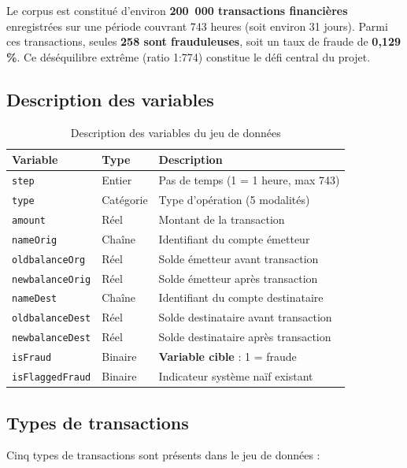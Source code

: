 Le corpus est constitué d'environ \textbf{200~000 transactions financières} enregistrées
sur une période couvrant 743 heures (soit environ 31 jours). Parmi ces transactions, seules
\textbf{258 sont frauduleuses}, soit un taux de fraude de \textbf{0,129\,\%}.
Ce déséquilibre extrême (ratio 1:774) constitue le défi central du projet.

\subsection{Description des variables}

\begin{table}[H]
\centering
\caption{Description des variables du jeu de données}
\label{tab:variables}
\begin{tabular}{lll}
\toprule
\textbf{Variable} & \textbf{Type} & \textbf{Description} \\
\midrule
\texttt{step}           & Entier    & Pas de temps (1 = 1 heure, max 743) \\
\texttt{type}           & Catégorie & Type d'opération (5 modalités) \\
\texttt{amount}         & Réel      & Montant de la transaction \\
\texttt{nameOrig}       & Chaîne    & Identifiant du compte émetteur \\
\texttt{oldbalanceOrg}  & Réel      & Solde émetteur avant transaction \\
\texttt{newbalanceOrig} & Réel      & Solde émetteur après transaction \\
\texttt{nameDest}       & Chaîne    & Identifiant du compte destinataire \\
\texttt{oldbalanceDest} & Réel      & Solde destinataire avant transaction \\
\texttt{newbalanceDest} & Réel      & Solde destinataire après transaction \\
\texttt{isFraud}        & Binaire   & \textbf{Variable cible} : 1 = fraude \\
\texttt{isFlaggedFraud} & Binaire   & Indicateur système naïf existant \\
\bottomrule
\end{tabular}
\end{table}

\subsection{Types de transactions}

Cinq types de transactions sont présents dans le jeu de données :


